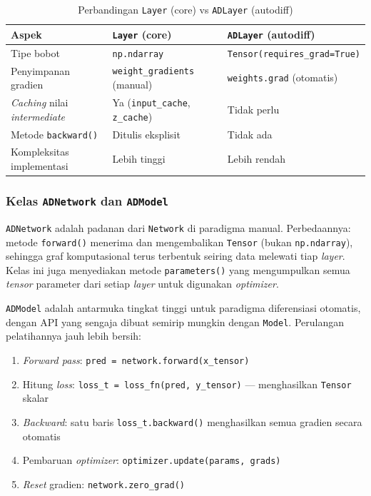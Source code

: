 \begin{table}[H]
    \centering
    \caption{Perbandingan \texttt{Layer} (core) vs \texttt{ADLayer} (autodiff)}
    \begin{tabular}{lll}
        \toprule
        \textbf{Aspek} & \textbf{\texttt{Layer} (core)} & \textbf{\texttt{ADLayer} (autodiff)} \\
        \midrule
        Tipe bobot & \texttt{np.ndarray} & \texttt{Tensor(requires\_grad=True)} \\
        Penyimpanan gradien & \texttt{weight\_gradients} (manual) & \texttt{weights.grad} (otomatis) \\
        \textit{Caching} nilai \textit{intermediate} & Ya (\texttt{input\_cache}, \texttt{z\_cache}) & Tidak perlu \\
        Metode \texttt{backward()} & Ditulis eksplisit & Tidak ada \\
        Kompleksitas implementasi & Lebih tinggi & Lebih rendah \\
        \bottomrule
    \end{tabular}
    \label{tab:layer-comparison}
\end{table}

\subsubsection{Kelas \texttt{ADNetwork} dan \texttt{ADModel}}

\texttt{ADNetwork} adalah padanan dari \texttt{Network} di paradigma manual. Perbedaannya: metode \texttt{forward()} menerima dan mengembalikan \texttt{Tensor} (bukan \texttt{np.ndarray}), sehingga graf komputasional terus terbentuk seiring data melewati tiap \textit{layer}. Kelas ini juga menyediakan metode \texttt{parameters()} yang mengumpulkan semua \textit{tensor} parameter dari setiap \textit{layer} untuk digunakan \textit{optimizer}.

\texttt{ADModel} adalah antarmuka tingkat tinggi untuk paradigma diferensiasi otomatis, dengan API yang sengaja dibuat semirip mungkin dengan \texttt{Model}. Perulangan pelatihannya jauh lebih bersih:

\begin{enumerate}
    \item \textit{Forward pass}: \texttt{pred = network.forward(x\_tensor)}
    \item Hitung \textit{loss}: \texttt{loss\_t = loss\_fn(pred, y\_tensor)} --- menghasilkan \texttt{Tensor} skalar
    \item \textit{Backward}: satu baris \texttt{loss\_t.backward()} menghasilkan semua gradien secara otomatis
    \item Pembaruan \textit{optimizer}: \texttt{optimizer.update(params, grads)}
    \item \textit{Reset} gradien: \texttt{network.zero\_grad()}
\end{enumerate}

